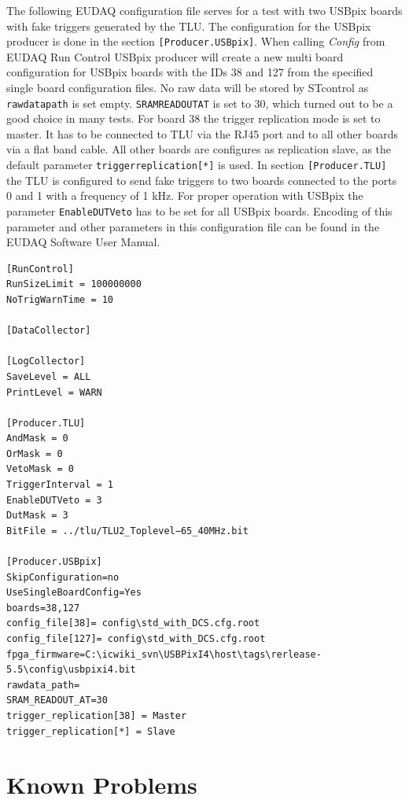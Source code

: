 \documentclass[a4paper,12pt]{article}
\begin{document}
The following EUDAQ configuration file serves for a test with two USBpix boards with
fake triggers generated by the TLU.
The configuration for the USBpix producer is done in the section 
{\tt [Producer.USBpix]}. When calling {\it Config} from EUDAQ
Run Control USBpix producer will create a new multi board configuration for USBpix
boards with the IDs 38 and 127 from the specified single board configuration files. No raw
data will be stored by STcontrol as {\tt rawdata\textunderscore path} is set empty. 
{\tt SRAM\textunderscore READOUT\textunderscore AT}
is set to 30, which turned out to be a good choice in many tests. For board 38 the trigger
replication mode is set to master. It has to be connected to TLU via the RJ45 port and
to all other boards via a flat band cable. All other boards are configures as replication
slave, as the default parameter {\tt trigger\textunderscore replication[*]} is used.
In section {\tt [Producer.TLU]} the TLU is configured to send fake triggers to two boards
connected to the ports 0 and 1 with a frequency of 1 kHz. For proper operation with
USBpix the parameter {\tt EnableDUTVeto} has to be set for all USBpix boards. Encoding
of this parameter and other parameters in this configuration file can be found in the
EUDAQ Software User Manual.

\begin{lstlisting}
[RunControl]
RunSizeLimit = 100000000
NoTrigWarnTime = 10

[DataCollector]

[LogCollector]
SaveLevel = ALL
PrintLevel = WARN

[Producer.TLU]
AndMask = 0
OrMask = 0
VetoMask = 0
TriggerInterval = 1
EnableDUTVeto = 3
DutMask = 3
BitFile = ../tlu/TLU2_Toplevel−65_40MHz.bit

[Producer.USBpix]
SkipConfiguration=no
UseSingleBoardConfig=Yes
boards=38,127
config_file[38]= config\std_with_DCS.cfg.root
config_file[127]= config\std_with_DCS.cfg.root
fpga_firmware=C:\icwiki_svn\USBPixI4\host\tags\rerlease-5.5\config\usbpixi4.bit
rawdata_path=
SRAM_READOUT_AT=30
trigger_replication[38] = Master
trigger_replication[*] = Slave

\end{lstlisting}

\section{Known Problems}
\end{document}
